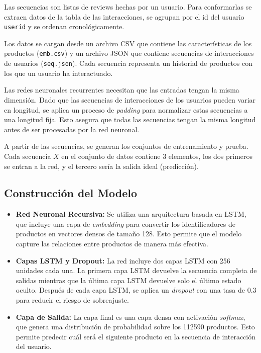 \documentclass[runningheads]{llncs}
\begin{document}
Las secuencias son listas de reviews hechas por un usuario. Para conformarlas se extraen datos de la tabla de las interacciones, se agrupan por el id del usuario \texttt{userid} y se ordenan cronol\'ogicamente.

Los datos se cargan desde un archivo CSV que contiene las características de los productos (\texttt{emb.csv}) y un archivo JSON que contiene secuencias de interacciones de usuarios (\texttt{seq.json}). Cada secuencia representa un historial de productos con los que un usuario ha interactuado. 

Las redes neuronales recurrentes necesitan que las entradas tengan la misma dimensión. Dado que las secuencias de interacciones de los usuarios pueden variar en longitud, se aplica un proceso de \textit{padding} para normalizar estas secuencias a una longitud fija. Esto asegura que todas las secuencias tengan la misma longitud antes de ser procesadas por la red neuronal. 

A partir de las secuencias, se generan los conjuntos de entrenamiento y prueba. Cada secuencia $X$ en el conjunto de datos contiene 3 elementos, los dos primeros se entran a la red, y el tercero sería la salida ideal (predicción).

\subsection{Construcción del Modelo}

\begin{itemize}
    \item \textbf{Red Neuronal Recursiva:} Se utiliza una arquitectura basada en LSTM, que incluye una capa de \textit{embedding} para convertir los identificadores de productos en vectores densos de tamaño 128. Esto permite que el modelo capture las relaciones entre productos de manera más efectiva.
    \item \textbf{Capas LSTM y Dropout:} La red incluye dos capas LSTM con 256 unidades cada una. La primera capa LSTM devuelve la secuencia completa de salidas mientras que la última capa LSTM devuelve solo el último estado oculto. Después de cada capa LSTM, se aplica un \textit{dropout} con una tasa de 0.3 para reducir el riesgo de sobreajuste.
    \item \textbf{Capa de Salida:} La capa final es una capa densa con activación \textit{softmax}, que genera una distribución de probabilidad sobre los 112590 productos. Esto permite predecir cuál será el siguiente producto en la secuencia de interacción del usuario.
\end{itemize}
\end{document}
